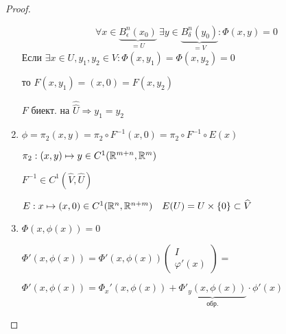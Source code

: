 \begin{proof}
\begin{enumerate}
                \[
                      \forall x \in \underbrace{B_\epsilon^n(x_0)}_{= U} \ \exists y \in \underbrace{B_\delta^n(y_0)}_{= V} : \Phi(x, y) = 0
                \]
                Если $\exists x \in U, y_1, y_2 \in V : \Phi(x, y_1) = \Phi(x, y_2) = 0$
                \par \quad то $F(x, y_1) = (x, 0) = F(x, y_2)$
                \par \quad \quad $F$ биект. на $\widehat{\widehat U} \Rightarrow y_1 = y_2$ %
            \item $\phi = \pi_2(x, y) = \pi_2 \circ F^{-1}(x, 0) = \pi_2 \circ F^{-1} \circ E(x)$
                \par $\pi_2 : (x, y) \mapsto y \in C^1(\mathbb{R}^{m+n}, \mathbb{R}^m)$
                \par $F^{-1} \in C^1(\widehat V, \widehat U)$
                \par $E  : x \mapsto (x, 0) \in C^1(\mathbb{R}^n, \mathbb{R}^{n+m}) \quad E(U) = U \times \{0\} \subset \widehat V$
            \item $\Phi(x, \phi(x)) = 0$
                \par $\Phi'(x, \phi(x)) = \Phi'(x, \phi(x)) \begin{pmatrix}
                    I \\ \varphi'(x)\end{pmatrix} = $ %
                \par $\Phi'(x, \phi(x)) = \Phi_x'(x, \phi(x)) + \underbrace{\Phi'_y(x, \phi(x))}_{\text{обр.}} \cdot \phi'(x)$ 
        \end{enumerate}
    \end{proof}

